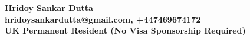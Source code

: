 \documentclass[margin, centered]{res}
\begin{document}
\setlength{\voffset}{0.1in}
\begin{center}
    
    \LARGE\bf{\href{https://www.hridaydutta123.github.io}{Hridoy Sankar Dutta}} \\
    \normalsize{hridoysankardutta@gmail.com, +447469674172}\\
    \normalsize{UK Permanent Resident (No Visa Sponsorship Required)}
    
\end{center}
\vspace{-6mm}
\hfill
\vspace{-7mm}
\end{document}
